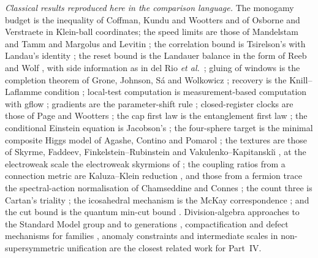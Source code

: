\documentclass[aps,pra,onecolumn,superscriptaddress,nofootinbib,10pt]{revtex4-2}
\theoremstyle{definition}
\theoremstyle{remark}
\begin{document}
\emph{Classical results reproduced here in the comparison language.}  The monogamy budget is the inequality of
Coffman, Kundu and Wootters \cite{n4:CKW} and of Osborne and Verstraete \cite{n4:OV} in Klein-ball coordinates; the speed
limits are those of Mandelstam and Tamm \cite{n4:MT} and Margolus and Levitin \cite{n4:ML}; the correlation bound is
Tsirelson's \cite{n4:Tsirelson} with Landau's identity \cite{n4:Landau}; the reset bound is the Landauer balance in the form of
Reeb and Wolf \cite{n1-landauer,n1-reeb}, with side information as in del Rio \emph{et al.}\ \cite{rf:delRio2011}; gluing of windows
is the completion theorem of Grone, Johnson, S\'a and Wolkowicz \cite{n2-grone}; recovery is the Knill--Laflamme
condition \cite{n4:KL}; local-test computation is measurement-based computation with gflow \cite{n5-rb,n5-gflow}; gradients are
the parameter-shift rule \cite{rf:Mitarai2018,n5-shift-ref}; closed-register clocks are those of Page and Wootters \cite{n1-pw}; the cap
first law is the entanglement first law \cite{n1-blanco}; the conditional Einstein equation is Jacobson's \cite{ub:jac16}; the
four-sphere target is the minimal composite Higgs model of Agashe, Contino and Pomarol \cite{n7:ACP,rf:Contino2011}; the
textures are those of Skyrme, Faddeev, Finkelstein--Rubinstein and Vakulenko--Kapitanski\u{\i}
\cite{n6:skyrme,n6:faddeev-niemi,n6:fr-original,n6:vk-original}, at the electroweak scale the electroweak skyrmions of
\cite{rf:GipsonTze1981,rf:DHoker1984a,rf:AmbjornRubakov1985}; the coupling ratios from a connection metric are Kaluza--Klein
reduction \cite{rf:Kerner1968,rf:SalamStrathdee1982,rf:Weinberg1983,cr:wittenkk}, and those from a fermion trace the
spectral-action normalisation of Chamseddine and Connes \cite{n7:CC}; the count three is Cartan's triality
\cite{tr:Schafer}; the icosahedral mechanism is the McKay correspondence \cite{gn:mckaysource}; and the cut bound is the
quantum min-cut bound \cite{ub:cui}.  Division-algebra approaches to the Standard Model group and to generations
\cite{rf:Furey2018a,rf:Furey2018b,rf:Boyle2026,rf:DuboisViolette2019,rf:Manogue2010,rf:Gillard2019,rf:Krasnov2021}, compactification and defect
mechanisms for families \cite{rf:RandjbarDaemi1983,rf:Libanov2001}, anomaly constraints \cite{rf:Minahan1990} and intermediate scales in
non-supersymmetric unification \cite{rf:Bertolini2009} are the closest related work for Part~IV.
\end{document}
